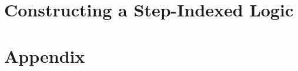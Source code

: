 \documentclass[acmsmall]{acmart}
\begin{document}








\section{Constructing a Step-Indexed Logic}














% 





\appendix
{}
\section*{Appendix}




\end{document}
